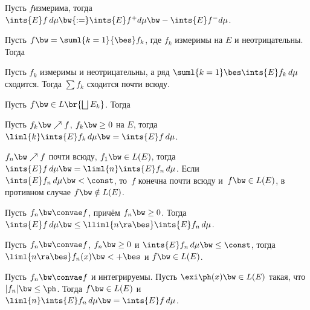 \documentclass[a4paper,draft]{article}
\begin{document}
\begin{df}
  Пусть $f$\т измерима, тогда $\ints{E}f\,d\mu \bw{:=} \ints{E}f^+d\mu \bw- \ints{E}f^-d\mu$.
\end{df}

\begin{theorem}
  Пусть $f \bw= \suml{k=1}{\bes} f_k$, где $f_k$ измеримы на $E$ и неотрицательны.
  Тогда 
\end{theorem}

\begin{imp}
  Пусть $f_k$ измеримы и неотрицательны, а ряд $\suml{k=1}\bes \ints{E}f_k\,d\mu$ сходится.
  Тогда $\sum f_k$ сходится почти всюду.
\end{imp}

\begin{theorem}
  Пусть $f \bw\in L\br{\bigsqcup E_k}$. Тогда
\end{theorem}

\begin{theorem}
  Пусть $f_k \bw\nearrow f$, $f_k \bw\ge 0$ на $E$, тогда
  $\liml{k}\ints{E}f_k\,d\mu \bw= \ints{E}f\,d\mu$.
\end{theorem}

\begin{theorem}
  $f_n \bw\nearrow f$ почти всюду, $f_1 \bw\in L(E)$, тогда
  $\ints{E}f\,d\mu \bw= \liml{n}\ints{E}f_n\,d\mu$.
  Если $\ints{E}f_n\,d\mu \bw< \const$, то~$f$
  конечна почти всюду и~$f \bw\in L(E)$, в противном случае $f \bw\notin L(E)$.
\end{theorem}

\begin{theorem}[Фату]
  Пусть $f_n \bw\convae f$, причём $f_n \bw\ge 0$. Тогда
  $\ints{E}f\,d\mu \bw\le \lliml{n\ra\bes} \ints{E}f_n\,d\mu$.
\end{theorem}

\begin{imp}
  Пусть $f_n \bw\convae f$, $f_n \bw\ge 0$ и $\ints{E}f_n\,d\mu \bw\le \const$,
  тогда $\liml{n\ra\bes}f_n(x) \bw< +\bes$ и $f \bw\in L(E)$.
\end{imp}

\begin{theorem}
  Пусть $f_n \bw\convae f$ и интегрируемы. Пусть $\exi \ph(x) \bw\in L(E)$ такая, что $|f_n| \bw\le \ph$.
  Тогда $f \bw\in L(E)$ и $\liml{n}\ints{E}f_n\,d\mu \bw= \ints{E}f\,d\mu$.
\end{theorem}
\end{document}
